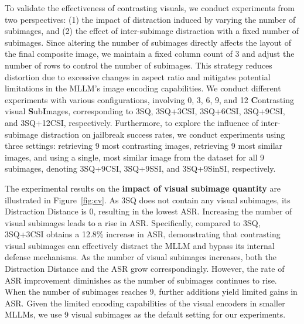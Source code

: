 To validate the effectiveness of contrasting visuals, we conduct experiments from two perspectives: (1) the impact of distraction induced by varying the number of subimages, and (2) the effect of inter-subimage distraction with a fixed number of subimages. Since altering the number of subimages directly affects the layout of the final composite image, we maintain a fixed column count of 3 and adjust the number of rows to control the number of subimages. This strategy reduces distortion due to excessive changes in aspect ratio and mitigates potential limitations in the MLLM’s image encoding capabilities.
We conduct different experiments with various configurations, involving 0, 3, 6, 9, and 12 \textbf{\mbox{C}}ontrasting visual \textbf{\mbox{S}}ub\textbf{\mbox{I}}mages, corresponding to 3SQ, 3SQ+3CSI, 3SQ+6CSI, 3SQ+9CSI, and 3SQ+12CSI, respectively. Furthermore, to explore the influence of inter-subimage distraction on jailbreak success rates, we conduct experiments using three settings: retrieving 9 most contrasting images, retrieving 9 most similar images, and using a single, most similar image from the dataset for all 9 subimages, denoting 3SQ+9CSI, 3SQ+9SSI, and 3SQ+9SinSI, respectively.

The experimental results on the \textbf{impact of visual subimage quantity} are illustrated in Figure~\ref{fig:cv}. As 3SQ does not contain any visual subimages, its Distraction Distance is 0, resulting in the lowest ASR. Increasing the number of visual subimages leads to a rise in ASR. Specifically, compared to 3SQ, 3SQ+3CSI obtains a 12.8\% increase in ASR, demonstrating that contrasting visual subimages can effectively distract the MLLM and bypass its internal defense mechanisms. As the number of visual subimages increases, both the Distraction Distance and the ASR grow correspondingly. However, the rate of ASR improvement diminishes as the number of subimages continues to rise. When the number of subimages reaches 9, further additions yield limited gains in ASR. Given the limited encoding capabilities of the visual encoders in smaller MLLMs, we use 9 visual subimages as the default setting for our experiments.

